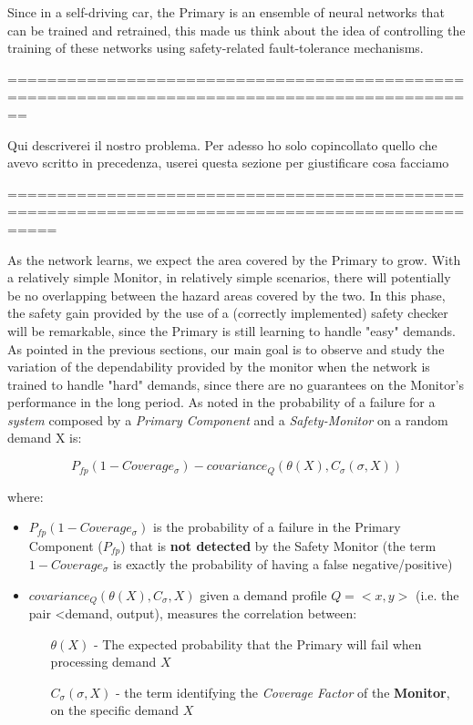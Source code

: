 Since in a self-driving car, the Primary is an ensemble of neural networks that can be trained and retrained, this made us think about the idea of controlling the training of these networks using safety-related fault-tolerance mechanisms.\


==============================================================================================

Qui descriverei il nostro problema. Per adesso ho solo copincollato quello che avevo scritto in precedenza, userei questa sezione per giustificare cosa facciamo

=================================================================================================


As the network learns, we expect the area covered by the Primary to grow. With a relatively simple Monitor, in relatively simple scenarios, there will potentially be no overlapping between the hazard areas covered by the two. In this phase, the safety gain provided by the use of a (correctly implemented) safety checker will be remarkable, since the Primary is still learning to handle "easy" demands. As pointed in the previous sections, our main goal is to observe and study the variation of the dependability provided by the monitor when the network is trained to handle "hard" demands, since there are no guarantees on the Monitor's performance in the long period.\newline
As noted in \cite{striginiPopov} the probability of a failure for a \textsl{system} composed by a \textsl{Primary Component} and a \textsl{Safety-Monitor} on a random demand X is:

\begin{equation}
P_{fp} (1 - Coverage_{\sigma}) - covariance_{Q} (\theta (X), C_{\sigma} (\sigma , X))
\end{equation}

where:

\begin{itemize}
	\item $P_{fp} (1 - Coverage_{\sigma})$ is the probability of a failure in the Primary Component ($P_{fp}$) that is \textbf{not detected} by the Safety Monitor (the term $1 - Coverage_{\sigma}$ is exactly the probability of having a false negative/positive)
	\item $covariance_{Q} (\theta (X), C_{\sigma}, X)$ given a demand profile $Q = <x, y>$ (i.e. the pair <demand, output), measures the correlation between:
	\begin{itemize}
		\item[$\theta (X)$ -] The expected probability that the Primary will fail when processing demand $X$
		\item[$C_{\sigma} (\sigma, X)$ -] the term identifying the \textsl{Coverage Factor} of the \textbf{Monitor}, on the specific demand $X$
	\end{itemize}
\end{itemize}

